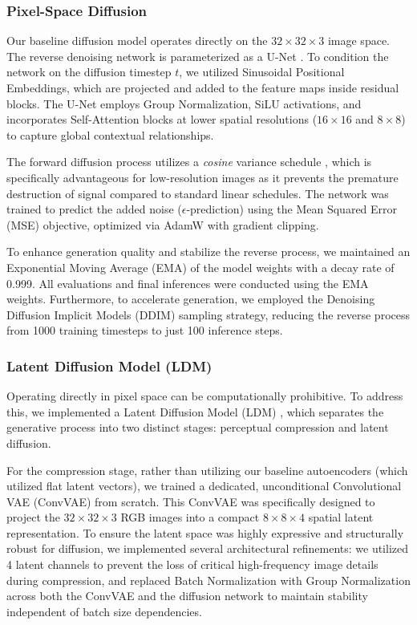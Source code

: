 \documentclass[runningheads]{llncs}
\begin{document}
\subsubsection{Pixel-Space Diffusion}
Our baseline diffusion model operates directly on the $32 \times 32 \times 3$ image space. The reverse denoising network is parameterized as a U-Net \cite{ho2020denoising}. To condition the network on the diffusion timestep $t$, we utilized Sinusoidal Positional Embeddings, which are projected and added to the feature maps inside residual blocks. The U-Net employs Group Normalization, SiLU activations, and incorporates Self-Attention blocks at lower spatial resolutions ($16 \times 16$ and $8 \times 8$) to capture global contextual relationships.

The forward diffusion process utilizes a \textit{cosine} variance schedule \cite{nichol2021improved}, which is specifically advantageous for low-resolution images as it prevents the premature destruction of signal compared to standard linear schedules. The network was trained to predict the added noise ($\epsilon$-prediction) using the Mean Squared Error (MSE) objective, optimized via AdamW with gradient clipping.

To enhance generation quality and stabilize the reverse process, we maintained an Exponential Moving Average (EMA) of the model weights with a decay rate of 0.999. All evaluations and final inferences were conducted using the EMA weights. Furthermore, to accelerate generation, we employed the Denoising Diffusion Implicit Models (DDIM) \cite{song2020denoising} sampling strategy, reducing the reverse process from 1000 training timesteps to just 100 inference steps.
\subsubsection{Latent Diffusion Model (LDM)}
Operating directly in pixel space can be computationally prohibitive. To address this, we implemented a Latent Diffusion Model (LDM) \cite{rombach2022high}, which separates the generative process into two distinct stages: perceptual compression and latent diffusion. 

For the compression stage, rather than utilizing our baseline autoencoders (which utilized flat latent vectors), we trained a dedicated, unconditional Convolutional VAE (ConvVAE) from scratch. This ConvVAE was specifically designed to project the $32 \times 32 \times 3$ RGB images into a compact $8 \times 8 \times 4$ spatial latent representation. To ensure the latent space was highly expressive and structurally robust for diffusion, we implemented several architectural refinements: we utilized 4 latent channels to prevent the loss of critical high-frequency image details during compression, and replaced Batch Normalization with Group Normalization across both the ConvVAE and the diffusion network to maintain stability independent of batch size dependencies.
\end{document}
